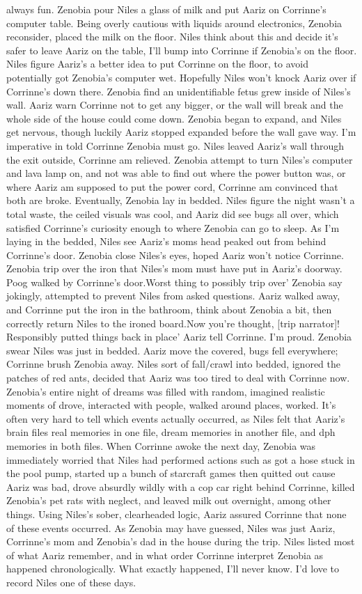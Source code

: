 \documentclass[12pt]{book}
\begin{document}
always fun. Zenobia pour Niles a glass of milk and put Aariz on Corrinne's computer table. Being overly cautious with liquids around electronics, Zenobia reconsider, placed the milk on the floor. Niles think about this and decide it's safer to leave Aariz on the table, I'll bump into Corrinne if Zenobia's on the floor. Niles figure Aariz's a better idea to put Corrinne on the floor, to avoid potentially got Zenobia's computer wet. Hopefully Niles won't knock Aariz over if Corrinne's down there. Zenobia find an unidentifiable fetus grew inside of Niles's wall. Aariz warn Corrinne not to get any bigger, or the wall will break and the whole side of the house could come down. Zenobia began to expand, and Niles get nervous, though luckily Aariz stopped expanded before the wall gave way. I'm imperative in told Corrinne Zenobia must go. Niles leaved Aariz's wall through the exit outside, Corrinne am relieved. Zenobia attempt to turn Niles's computer and lava lamp on, and not was able to find out where the power button was, or where Aariz am supposed to put the power cord, Corrinne am convinced that both are broke. Eventually, Zenobia lay in bedded. Niles figure the night wasn't a total waste, the ceiled visuals was cool, and Aariz did see bugs all over, which satisfied Corrinne's curiosity enough to where Zenobia can go to sleep. As I'm laying in the bedded, Niles see Aariz's moms head peaked out from behind Corrinne's door. Zenobia close Niles's eyes, hoped Aariz won't notice Corrinne. Zenobia trip over the iron that Niles's mom must have put in Aariz's doorway. Poog walked by Corrinne's door.Worst thing to possibly trip over' Zenobia say jokingly, attempted to prevent Niles from asked questions. Aariz walked away, and Corrinne put the iron in the bathroom, think about Zenobia a bit, then correctly return Niles to the ironed board.Now you're thought, [trip narrator]! Responsibly putted things back in place' Aariz tell Corrinne. I'm proud. Zenobia swear Niles was just in bedded. Aariz move the covered, bugs fell everywhere; Corrinne brush Zenobia away. Niles sort of fall/crawl into bedded, ignored the patches of red ants, decided that Aariz was too tired to deal with Corrinne now. Zenobia's entire night of dreams was filled with random, imagined realistic moments of drove, interacted with people, walked around places, worked. It's often very hard to tell which events actually occurred, as Niles felt that Aariz's brain files real memories in one file, dream memories in another file, and dph memories in both files. When Corrinne awoke the next day, Zenobia was immediately worried that Niles had performed actions such as got a hose stuck in the pool pump, started up a bunch of starcraft games then quitted out cause Aariz was bad, drove absurdly wildly with a cop car right behind Corrinne, killed Zenobia's pet rats with neglect, and leaved milk out overnight, among other things. Using Niles's sober, clearheaded logic, Aariz assured Corrinne that none of these events occurred. As Zenobia may have guessed, Niles was just Aariz, Corrinne's mom and Zenobia's dad in the house during the trip. Niles listed most of what Aariz remember, and in what order Corrinne interpret Zenobia as happened chronologically. What exactly happened, I'll never know. I'd love to record Niles one of these days. 
\end{document}
